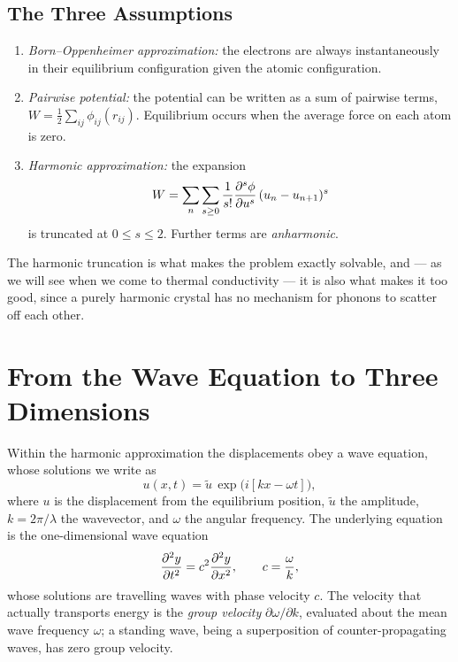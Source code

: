 \subsection{The Three Assumptions}

\begin{fact}
\begin{enumerate}
    \item \emph{Born--Oppenheimer approximation:} the electrons are always instantaneously in their equilibrium configuration given the atomic configuration.
    \item \emph{Pairwise potential:} the potential can be written as a sum of pairwise terms, $W = \tfrac{1}{2}\sum_{ij}\phi_{ij}(r_{ij})$. Equilibrium occurs when the average force on each atom is zero.
    \item \emph{Harmonic approximation:} the expansion
    \begin{equation}
        W = \sum_n \sum_{s \geq 0} \frac{1}{s!} \pdv[s]{\phi}{u}\,(u_n - u_{n+1})^s
    \end{equation}
    is truncated at $0 \leq s \leq 2$. Further terms are \emph{anharmonic}.
\end{enumerate}
\end{fact}

The harmonic truncation is what makes the problem exactly solvable, and --- as we will see when we come to thermal conductivity --- it is also what makes it too good, since a purely harmonic crystal has no mechanism for phonons to scatter off each other.

\section{From the Wave Equation to Three Dimensions}

Within the harmonic approximation the displacements obey a wave equation, whose solutions we write as
\begin{equation}
    u(x, t) = \tilde{u}\,\exp\bigl(i[kx - \omega t]\bigr),
\end{equation}
where $u$ is the displacement from the equilibrium position, $\tilde{u}$ the amplitude, $k = 2\pi/\lambda$ the wavevector, and $\omega$ the angular frequency. The underlying equation is the one-dimensional wave equation
\begin{equation}
    \pdv[2]{y}{t} = c^2 \pdv[2]{y}{x}, \qquad c = \frac{\omega}{k},
\end{equation}
whose solutions are travelling waves with phase velocity $c$. The velocity that actually transports energy is the \emph{group velocity} $\partial\omega/\partial k$, evaluated about the mean wave frequency $\omega$; a standing wave, being a superposition of counter-propagating waves, has zero group velocity.

